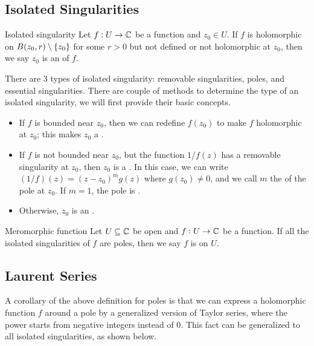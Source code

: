 \documentclass{styles/tufte}
\begin{document}
\subsection{Isolated Singularities}
  
  \begin{definition}{Isolated singularity}{}
    Let $f: U \to \mathbb{C}$ be a function and $z_0 \in U$. If $f$ is holomorphic on $B(z_0, r) \setminus \set{z_0}$ for some $r > 0$ but not defined or not holomorphic at $z_0$, then we say $z_0$ is an  of $f$.
  \end{definition}
  
  There are 3 types of isolated singularity: removable singularities, poles, and essential singularities. There are couple of methods to determine the type of an isolated singularity, we will first provide their basic concepts.
  \begin{itemize}
    \item If $f$ is bounded near $z_0$, then we can redefine $f(z_0)$ to make $f$ holomorphic at $z_0$; this makes $z_0$ a .
    \item If $f$ is not bounded near $z_0$, but the function $1 / f(z)$ has a removable singularity at $z_0$, then $z_0$ is a . In this case, we can write $(1/f)(z) = (z-z_0)^m g(z)$ where $g(z_0) \neq 0$, and we call $m$ the  of the pole at $z_0$. If $m = 1$, the pole is .
    \item Otherwise, $z_0$ is an .
  \end{itemize}
  
  \begin{definition}{Meromorphic function}{}
    Let $U \subseteq \mathbb{C}$ be open and $f: U \to \mathbb{C}$ be a function. If all the isolated singularities of $f$ are poles, then we say $f$ is  on $U$.
  \end{definition}
  
  
\subsection{Laurent Series}
  
  A corollary of the above definition for poles is that we can express a holomorphic function $f$ around a pole by a generalized version of Taylor series, where the power starts from negative integers instead of $0$. This fact can be generalized to all isolated singularities, as shown below.
  
\end{document}
